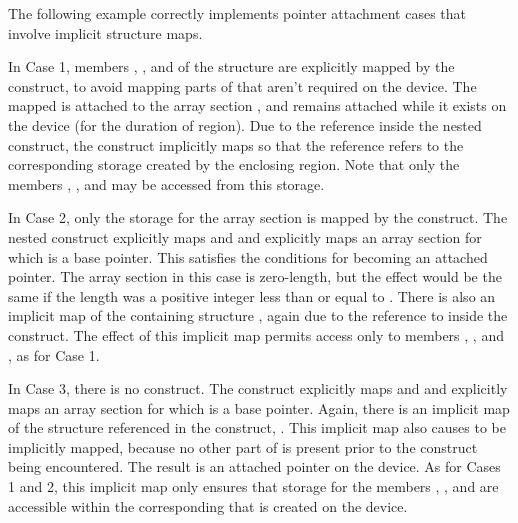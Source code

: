  


The following example correctly implements pointer attachment cases that
involve implicit structure maps.

In Case 1, members , , and  of the structure 
are explicitly mapped by the  construct, to avoid
mapping parts of  that aren't required on the device. The mapped
 is attached to the array section , and remains
attached while it exists on the device (for the duration of
 region).  Due to the  reference inside the
nested  construct, the construct implicitly maps  so that
the reference refers to the corresponding storage created by the enclosing
 region. Note that only the members ,
, and  may be accessed from this storage.

In Case 2, only the storage for the array section  is mapped
by the  construct.  The nested 
construct explicitly maps  and  and explicitly
maps an array section for which  is a base pointer. This satisfies
the conditions for  becoming an attached pointer. The array
section in this case is zero-length, but the effect would be the same if the
length was a positive integer less than or equal to . There is also an
implicit map of the containing structure , again due to the reference
to  inside the construct. The effect of this implicit map permits
access only to members , , and , as for Case 1. 

In Case 3, there is no  construct. The 
construct explicitly maps  and  and explicitly
maps an array section for which  is a base pointer. Again, there is
an implicit map of the structure referenced in the construct, . This
implicit map also causes  to be implicitly mapped, because no other
part of  is present prior to the construct being encountered. The
result is an attached pointer  on the device. As for Cases 1 and 2,
this implicit map only ensures that storage for the members , ,
and  are accessible within the corresponding  that is created
on the device.


